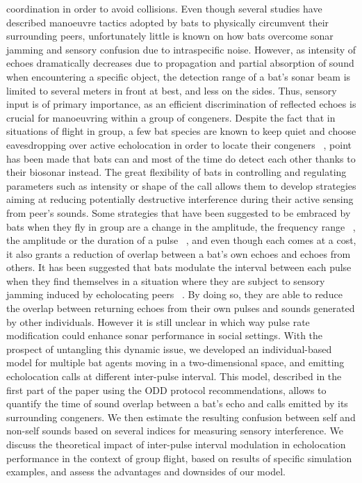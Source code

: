 \documentclass[12pt]{article}
\begin{document}
coordination in order to avoid collisions. Even though several studies have described manoeuvre tactics adopted by bats to physically circumvent their surrounding peers, unfortunately little is known on how bats overcome sonar jamming and sensory confusion due to intraspecific noise. However, as intensity of echoes dramatically decreases due to propagation and partial absorption of sound when encountering a specific object, the detection range of a bat’s sonar beam is limited to several meters in front at best, and less on the sides. Thus, sensory input is of primary importance, as an efficient discrimination of reflected echoes is crucial for manoeuvring within a group of congeners. Despite the fact that in situations of flight in group, a few bat species are known to keep quiet and choose eavesdropping over active echolocation in order to locate their congeners ~\cite{Barclay1982,Chiu2008}, point has been made that bats can and most of the time do detect each other thanks to their biosonar instead. The great flexibility of bats in controlling and regulating parameters such as intensity or shape of the call allows them to develop strategies aiming at reducing potentially destructive interference during their active sensing from peer’s sounds. Some strategies that have been suggested to be embraced by bats when they fly in group are a change in the amplitude, the frequency range ~\cite{Bates2008,Hiryu2010}, the amplitude or the duration of a pulse ~\cite{Amichai2015}, and even though each comes at a cost, it also grants a reduction of overlap between a bat’s own echoes and echoes from others.  It has been suggested that bats modulate the interval between each pulse when they find themselves in a situation where they are subject to sensory jamming induced by echolocating peers ~\cite{Jarvis2013,Petrites2009}. By doing so, they are able to reduce the overlap between returning echoes from their own pulses and sounds generated by other individuals. However it is still unclear in which way pulse rate modification could enhance sonar performance in social settings. With the prospect of untangling this dynamic issue, we developed an individual-based model for multiple bat agents moving in a two-dimensional space, and emitting echolocation calls at different inter-pulse interval. This model, described in the first part of the paper using the ODD protocol recommendations, allows to quantify the time of sound overlap between a bat's echo and calls emitted by its surrounding congeners. We then estimate the resulting confusion between self and non-self sounds based on several indices for measuring sensory interference. We discuss the theoretical impact of inter-pulse interval modulation in echolocation performance in the context of group flight, based on results of specific simulation examples, and assess the advantages and downsides of our model.
\end{document}
